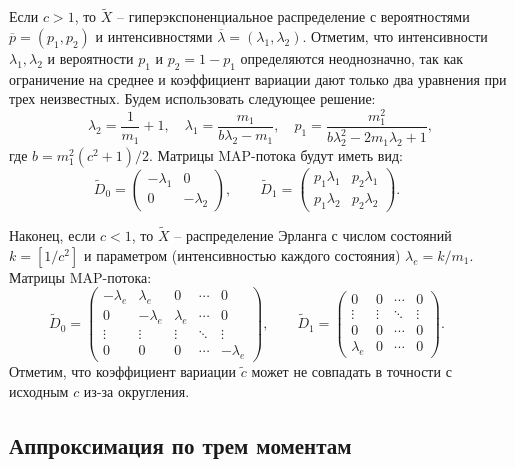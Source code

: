 Если $c > 1$, то $\tilde{X}$ -- гиперэкспоненциальное распределение с вероятностями $\overline{p} = (p_1, p_2)$ и интенсивностями $\overline{\lambda} = (\lambda_1, \lambda_2)$. Отметим, что интенсивности $\lambda_1, \lambda_2$ и вероятности $p_1$ и $p_2 = 1 - p_1$ определяются неоднозначно, так как ограничение на среднее и коэффициент вариации дают только два уравнения при трех неизвестных. Будем использовать следующее решение:
$$
\lambda_2 = \frac{1}{m_1} + 1,\quad \lambda_1 = \frac{m_1}{b \lambda_2 - m_1}, \quad p_1 = \frac{m_1^2}{b \lambda_2^2 - 2 m_1 \lambda_2 + 1},
$$
где $b = m_1^2(c^2 + 1) / 2$. Матрицы MAP-потока будут иметь вид:
$$
\tilde{D}_0 = \left(
    \begin{matrix}
        -\lambda_1 & 0\\
        0 & -\lambda_2
    \end{matrix}
    \right),\qquad
\tilde{D}_1 = \left(
    \begin{matrix}
        p_1 \lambda_1 & p_2 \lambda_1\\
        p_1 \lambda_2 & p_2 \lambda_2
    \end{matrix}
    \right).\qquad
$$

Наконец, если $c < 1$, то $\tilde{X}$ -- распределение Эрланга с числом состояний $k = \left[ 1 / c^2 \right]$ и параметром (интенсивностью каждого состояния) $\lambda_e = k / m_1$. Матрицы MAP-потока:
$$
\tilde{D}_0 = \left(
    \begin{matrix}
        -\lambda_e & \lambda_e & 0 & \cdots & 0\\
        0 & -\lambda_e & \lambda_e & \cdots & 0\\
        \vdots & \vdots & \vdots & \ddots & \vdots\\
        0 & 0 & 0 & \cdots &-\lambda_e
    \end{matrix}
    \right),\qquad
\tilde{D}_1 = \left(
    \begin{matrix}
        0 & 0 & \cdots & 0\\
        \vdots & \vdots & \ddots & \vdots\\
        0 & 0 & \cdots & 0\\
        \lambda_e & 0 & \cdots & 0
    \end{matrix}
    \right).\qquad
$$
Отметим, что коэффициент вариации $\tilde{c}$ может не совпадать в точности с исходным $c$ из-за округления.





\subsection{Аппроксимация по трем моментам}\label{sec:ch4_approx_m3}

